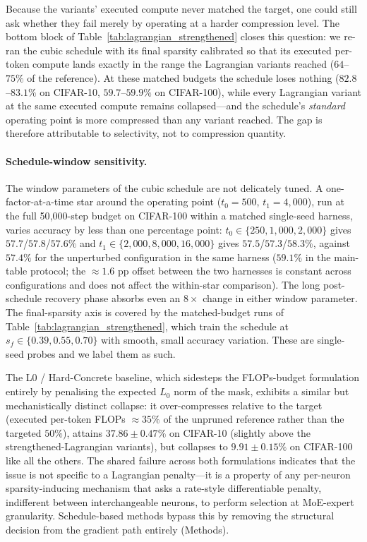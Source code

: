 \documentclass[fleqn,10pt]{article}
\begin{document}
Because the variants' executed compute never matched the target,
one could still ask whether they fail merely by operating at a
harder compression level. The bottom block of
Table~\ref{tab:lagrangian_strengthened} closes this question: we
re-ran the cubic schedule with its final sparsity calibrated so
that its executed per-token compute lands exactly in the range the
Lagrangian variants reached ($64$--$75\%$ of the reference). At
these matched budgets the schedule loses nothing ($82.8$--$83.1\%$
on CIFAR-10, $59.7$--$59.9\%$ on CIFAR-100), while every Lagrangian
variant at the same executed compute remains collapsed---and the
schedule's \emph{standard} operating point is more compressed than
any variant reached. The gap is therefore attributable to
selectivity, not to compression quantity.

\paragraph{Schedule-window sensitivity.}
The window parameters of the cubic schedule are not delicately
tuned. A one-factor-at-a-time star around the operating point
($t_0{=}500$, $t_1{=}4{,}000$), run at the full 50{,}000-step budget
on CIFAR-100 within a matched single-seed harness, varies accuracy
by less than one percentage point: $t_0 \in \{250, 1{,}000,
2{,}000\}$ gives $57.7$/$57.8$/$57.6\%$ and $t_1 \in \{2{,}000,
8{,}000, 16{,}000\}$ gives $57.5$/$57.3$/$58.3\%$, against $57.4\%$
for the unperturbed configuration in the same harness ($59.1\%$ in
the main-table protocol; the $\approx\!1.6$ pp offset between the
two harnesses is constant across configurations and does not affect
the within-star comparison). The long post-schedule recovery phase
absorbs even an $8\times$ change in either window parameter. The
final-sparsity axis is covered by the matched-budget runs of
Table~\ref{tab:lagrangian_strengthened}, which train the schedule at
$s_f \in \{0.39, 0.55, 0.70\}$ with smooth, small accuracy
variation. These are single-seed probes and we label them as such.

The L0 / Hard-Concrete baseline\cite{louizos2018learning}, which
sidesteps the FLOPs-budget formulation entirely by penalising the
expected $L_0$ norm of the mask, exhibits a similar but
mechanistically distinct collapse: it over-compresses relative to
the target (executed per-token FLOPs ${\approx}35\%$ of the
unpruned reference rather than the targeted $50\%$), attains
$37.86 \pm 0.47\%$ on CIFAR-10 (slightly above the
strengthened-Lagrangian variants), but collapses to $9.91 \pm 0.15\%$
on CIFAR-100 like all the others. The shared failure across both
formulations indicates that the issue is not specific to a
Lagrangian penalty---it is a property of any per-neuron
sparsity-inducing mechanism that asks a rate-style differentiable
penalty, indifferent between interchangeable neurons, to perform
selection at MoE-expert granularity. Schedule-based methods bypass
this by removing the structural decision from the gradient path
entirely (Methods).
\end{document}
